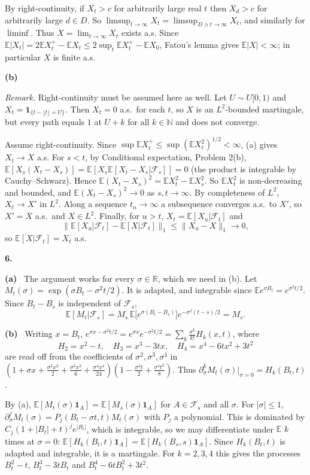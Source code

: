 \documentclass[11pt,a4paper]{article}
\newcommand{\E}{\mathbb{E}}
\newcommand{\R}{\mathbb{R}}
\newcommand{\N}{\mathbb{N}}
\newcommand{\F}{\mathcal{F}}
\newcommand{\1}{\mathbf{1}}
\newcommand{\prob}[1]{\par\medskip\noindent\textbf{#1}\quad}
\newcommand{\sub}[1]{\par\smallskip\noindent\textbf{#1}\ }
\newcommand{\note}[1]{\par\noindent\emph{Remark.} #1}
\begin{document}
By right-continuity, if $X_t>c$ for arbitrarily large real $t$ then $X_d>c$ for arbitrarily large $d\in D$. So
$\limsup_{t\to\infty}X_t=\limsup_{D\ni t\to\infty}X_t$, and similarly for $\liminf$. Thus $X=\lim_{t\to\infty}X_t$ exists a.s.
Since $\E|X_t|=2\E X_t^+-\E X_t\le2\sup_t\E X_t^+-\E X_0$, Fatou's lemma gives $\E|X|<\infty$; in particular $X$ is finite a.s.

\sub{(b)} \note{Right-continuity must be assumed here as well. Let $U\sim U[0,1)$ and
$X_t=\1_{\{t-\lfloor t\rfloor=U\}}$. Then $X_t=0$ a.s.\ for each $t$, so $X$ is an $L^2$-bounded martingale, but
every path equals $1$ at $U+k$ for all $k\in\N$ and does not converge.}

Assume right-continuity. Since $\sup\E X_t^+\le\sup(\E X_t^2)^{1/2}<\infty$, (a) gives $X_t\to X$ a.s.
For $s<t$, by Conditional expectation, Problem 2(b), $\E[X_s(X_t-X_s)]=\E[X_s\E[X_t-X_s|\F_s]]=0$ (the product is integrable by Cauchy--Schwarz). Hence
$\E(X_t-X_s)^2=\E X_t^2-\E X_s^2$. So $\E X_t^2$ is non-decreasing and bounded, and $\E(X_t-X_s)^2\to0$ as $s,t\to\infty$.
By completeness of $L^2$, $X_t\to X'$ in $L^2$. Along a sequence $t_n\to\infty$ a subsequence converges a.s.\ to $X'$,
so $X'=X$ a.s.\ and $X\in L^2$. Finally, for $u>t$, $X_t=\E[X_u|\F_t]$ and
\[\|\E[X_u|\F_t]-\E[X|\F_t]\|_1\le\|X_u-X\|_1\to0,\]
so $\E[X|\F_t]=X_t$ a.s.

\prob{6.}
\sub{(a)} The argument works for every $\sigma\in\R$, which we need in (b). Let $M_t(\sigma)=\exp(\sigma
B_t-\sigma^2t/2)$. It is adapted, and integrable since $\E e^{\sigma B_t}=e^{\sigma^2t/2}$. Since $B_t-B_s$ is independent
of $\F_s$,
\[\E[M_t|\F_s]=M_s\,\E\big[e^{\sigma(B_t-B_s)}\big]e^{-\sigma^2(t-s)/2}=M_s.\]

\sub{(b)} Writing $x=B_t$,
$e^{\sigma x-\sigma^2t/2}=e^{\sigma x}e^{-\sigma^2t/2}=\sum_k\frac{\sigma^k}{k!}H_k(x,t)$, where
\[
H_2=x^2-t,\quad H_3=x^3-3tx,\quad H_4=x^4-6tx^2+3t^2
\]
are read off from the coefficients of $\sigma^2,\sigma^3,\sigma^4$ in
$(1+\sigma x+\frac{\sigma^2x^2}2+\frac{\sigma^3x^3}6+\frac{\sigma^4x^4}{24})(1-\frac{\sigma^2t}2+\frac{\sigma^4t^2}8)$.
Thus $\partial_\sigma^kM_t(\sigma)|_{\sigma=0}=H_k(B_t,t)$.

By (a), $\E[M_t(\sigma)\1_A]=\E[M_s(\sigma)\1_A]$ for $A\in\F_s$ and all $\sigma$. For $|\sigma|\le1$,
$\partial^j_\sigma M_t(\sigma)=P_j(B_t-\sigma t,t)M_t(\sigma)$ with $P_j$ a polynomial. This is dominated by
$C_j(1+|B_t|+t)^je^{|B_t|}$, which is integrable, so we may differentiate under $\E$ $k$ times at $\sigma=0$:
$\E[H_k(B_t,t)\1_A]=\E[H_k(B_s,s)\1_A]$. Since $H_k(B_t,t)$ is adapted and integrable, it is a martingale. For
$k=2,3,4$ this gives the processes $B_t^2-t$, $B_t^3-3tB_t$ and $B_t^4-6tB_t^2+3t^2$.
\end{document}
